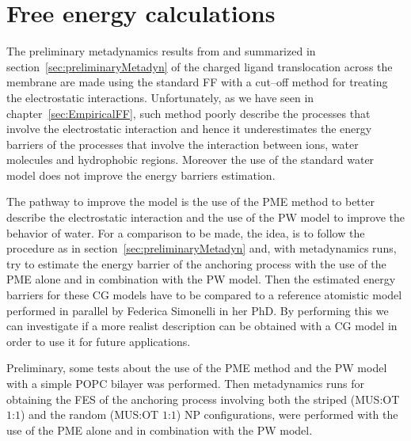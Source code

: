 \chapter{Free energy calculations}

The preliminary metadynamics results from \cite{ourPaper} and summarized in section~\ref{sec:preliminaryMetadyn} of the charged ligand translocation across the membrane are made using the standard \martini \ac{FF} with a cut--off method for treating the electrostatic interactions. Unfortunately, as we have seen in chapter~\ref{sec:EmpiricalFF}, such method poorly describe the processes that involve the electrostatic interaction and hence it underestimates the energy barriers of the processes that involve the interaction between ions, water molecules and hydrophobic regions. Moreover the use of the standard \martini water model does not improve the energy barriers estimation.

The pathway to improve the model is the use of the \ac{PME} method to better describe the electrostatic interaction and the use of the \ac{PW} model to improve the behavior of water. For a comparison to be made, the idea, is to follow the procedure as in section~\ref{sec:preliminaryMetadyn} and, with metadynamics runs, try to estimate the energy barrier of the anchoring process with the use of the \ac{PME} alone and in combination with the \ac{PW} model. Then the estimated energy barriers for these \ac{CG} models have to be compared to a reference atomistic model performed in parallel by Federica Simonelli in her PhD. By performing this we can investigate if a more realist description can be obtained with a \ac{CG} model in order to use it for future applications.

Preliminary, some tests about the use of the \ac{PME} method and the \ac{PW} model with a simple \ac{POPC} bilayer was performed. Then metadynamics runs for obtaining the \ac{FES} of the anchoring process involving both the striped (\ac{MUS}:\ac{OT} $1$:$1$) and the random (\ac{MUS}:\ac{OT} $1$:$1$) \ac{NP} configurations, were performed with the use of the \ac{PME} alone and in combination with the \ac{PW} model. 

